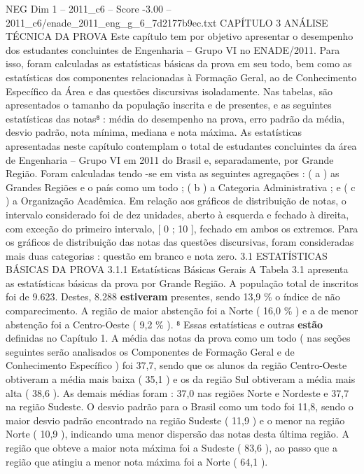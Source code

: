 \begin{textsample}{NEG Dim 1 – 2011\_c6 – Score -3.00 – 2011\_c6/enade\_2011\_eng\_g\_6\_7d2177b9ec.txt}  \label{ex:f1_neg_229}
CAPÍTULO 3 ANÁLISE TÉCNICA DA PROVA Este capítulo tem por objetivo apresentar o desempenho dos estudantes concluintes de Engenharia – Grupo VI no ENADE/2011.
Para isso, foram calculadas as estatísticas básicas da prova em seu todo, bem como as estatísticas dos componentes relacionadas à Formação Geral, ao de Conhecimento Específico da Área e das questões discursivas isoladamente.
Nas tabelas, são apresentados o tamanho da população inscrita e de presentes, e as seguintes estatísticas das notas⁸ : média do desempenho na prova, erro padrão da média, desvio padrão, nota mínima, mediana e nota máxima.
As estatísticas apresentadas neste capítulo contemplam o total de estudantes concluintes da área de Engenharia – Grupo VI em 2011 do Brasil e, separadamente, por Grande Região.
Foram calculadas tendo -se em vista as seguintes agregações : ( a ) as Grandes Regiões e o país como um todo ; ( b ) a Categoria Administrativa ; e ( c ) a Organização Acadêmica.
Em relação aos gráficos de distribuição de notas, o intervalo considerado foi de dez unidades, aberto à esquerda e fechado à direita, com exceção do primeiro intervalo, [ 0 ; 10 ], fechado em ambos os extremos.
Para os gráficos de distribuição das notas das questões discursivas, foram consideradas mais duas categorias : questão em branco e nota zero. 3.1 ESTATÍSTICAS BÁSICAS DA PROVA 3.1.1 Estatísticas Básicas Gerais A Tabela 3.1 apresenta as estatísticas básicas da prova por Grande Região.
A população total de inscritos foi de 9.623.
Destes, 8.288 \textbf{estiveram} presentes, sendo 13,9 \% o índice de não comparecimento.
A região de maior abstenção foi a Norte ( 16,0 \% ) e a de menor abstenção foi a Centro-Oeste ( 9,2 \% ). ⁸ Essas estatísticas e outras \textbf{estão} definidas no Capítulo 1.
A média das notas da prova como um todo ( nas seções seguintes serão analisados os Componentes de Formação Geral e de Conhecimento Específico ) foi 37,7, sendo que os alunos da região Centro-Oeste obtiveram a média mais baixa ( 35,1 ) e os da região Sul obtiveram a média mais alta ( 38,6 ).
As demais médias foram : 37,0 nas regiões Norte e Nordeste e 37,7 na região Sudeste.
O desvio padrão para o Brasil como um todo foi 11,8, sendo o maior desvio padrão encontrado na região Sudeste ( 11,9 ) e o menor na região Norte ( 10,9 ), indicando uma menor dispersão das notas desta última região.
A região que obteve a maior nota máxima foi a Sudeste ( 83,6 ), ao passo que a região que atingiu a menor nota máxima foi a Norte ( 64,1 ).

\end{textsample}
